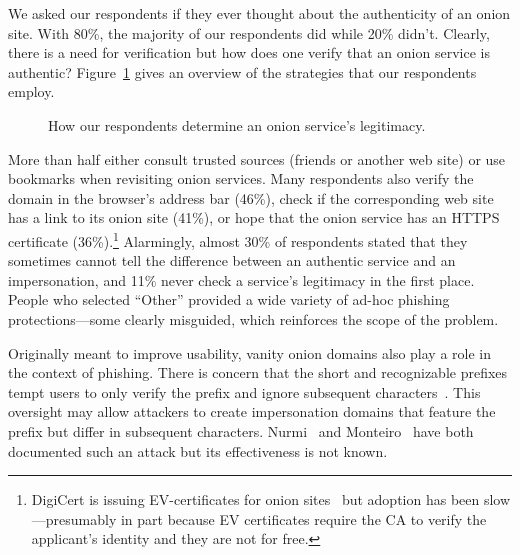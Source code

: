 We asked our respondents if they ever thought about the authenticity of an onion
site.  With 80\%, the majority of our respondents did while 20\% didn't.
Clearly, there is a need for verification but how does one verify that an onion
service is authentic?  Figure~\ref{fig:determining-legitimacy} gives an overview
of the strategies that our respondents employ.

\begin{figure}[t]
    \centering
    
    \caption{How our respondents determine an onion service's legitimacy.}
    \label{fig:determining-legitimacy}
\end{figure}

More than half either consult trusted sources (\eg friends or another web site)
or use bookmarks when revisiting onion services.  Many respondents also verify
the domain in the browser's address bar (46\%), check if the corresponding web
site has a link to its onion site (41\%), or hope that the onion service has an
HTTPS certificate (36\%).\footnote{DigiCert is issuing EV-certificates for onion
sites~\cite{DigiCert2015a} but adoption has been slow---presumably in part
because EV certificates require the CA to verify the applicant's identity
and they are not for free.}  Alarmingly, almost 30\% of respondents stated that
they sometimes cannot tell the difference between an authentic service and an
impersonation, and 11\% never check a service's legitimacy in the first place.
People who selected ``Other'' provided a wide variety of ad-hoc phishing
protections---some clearly misguided, which reinforces the scope of the problem.

Originally meant to improve usability, vanity onion domains also play a role in
the context of phishing.  There is concern that the short and recognizable
prefixes tempt users to only verify the prefix and ignore subsequent
characters~\cite{Winter2015a}.  This oversight may allow attackers to create
impersonation domains that feature the prefix but differ in subsequent
characters.  Nurmi~\cite{Nurmi2015a} and Monteiro~\cite{Monteiro2016a} have both
documented such an attack but its effectiveness is not known.

